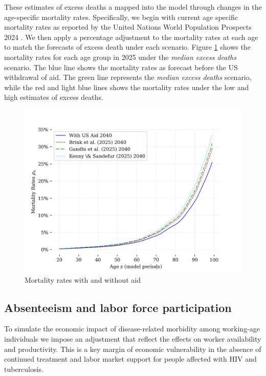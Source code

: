 \documentclass[letterpaper,12pt]{article}
\theoremstyle{definition}
\begin{document}
\begin{spacing}{1.5}
These estimates of excess deaths a mapped into the model through changes in the age-specific mortality rates.  Specifically, we begin with current age specific mortality rates as reported by the United Nations World Population Prospects 2024 \citep{UN2024}. We then apply a percentage adjustment to the mortality rates at each age to match the forecasts of excess death under each scenario. Figure \ref{fig:Mortality} shows the mortality rates for each age group in 2025 under the \textit{median excess deaths} scenario. The blue line shows the mortality rates as forecast before the US withdrawal of aid.  The green line represents the \textit{median excess deaths} scenario, while the red and light blue lines shows the mortality rates under the low and high estimates of excess deaths.


\begin{figure}[H]
    \caption{Mortality rates with and without aid}
    \label{fig:Mortality}
    \centering
    \includegraphics[scale=0.75]{./tables_figures/mortality_rates.png}
\end{figure}





\subsection{Absenteeism and labor force participation}
To simulate the economic impact of disease-related morbidity among working-age individuals we impose an adjustment that reflect the effects on worker availability and productivity. This is a key margin of economic vulnerability in the absence of continued treatment and labor market support for people affected with HIV and tuberculosis.


\end{spacing}
\end{document}
